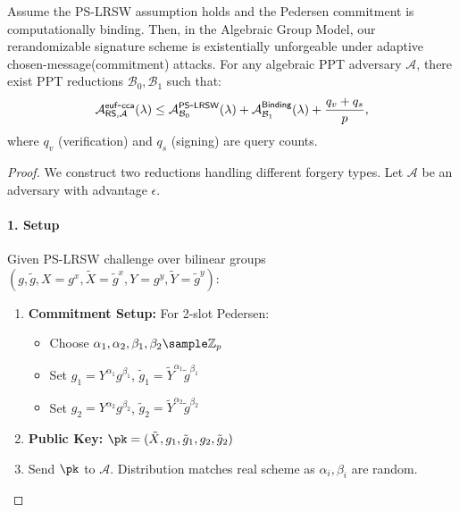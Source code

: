 \begin{theorem}
Assume the PS-LRSW assumption holds and the Pedersen commitment is computationally binding. Then, in the Algebraic Group Model, our rerandomizable signature scheme is existentially unforgeable under adaptive chosen-message(commitment) attacks. For any algebraic PPT adversary $\mathcal{A}$, there exist PPT reductions $\mathcal{B}_0, \mathcal{B}_1$ such that:
\[
\mathcal{A}^{\mathsf{euf\mbox{-}cca}}_{\mathsf{RS},\mathcal{A}}(\lambda) \leq \mathcal{A}^{\mathsf{PS\mbox{-}LRSW}}_{\mathcal{B}_0}(\lambda) + \mathcal{A}^{\mathsf{Binding}}_{\mathcal{B}_1}(\lambda) + \frac{q_v + q_s}{p},
\]
where $q_v$ (verification) and $q_s$ (signing) are query counts.
\end{theorem}

\begin{proof}
We construct two reductions handling different forgery types. Let $\mathcal{A}$ be an adversary with advantage $\epsilon$.

\paragraph{1. Setup}
Given PS-LRSW challenge over bilinear groups $(g, \tilde{g}, X=g^x, \tilde{X}=\tilde{g}^x, Y=g^y, \tilde{Y}=\tilde{g}^y)$:
\begin{enumerate}
    \item \textbf{Commitment Setup:} For 2-slot Pedersen:
    \begin{itemize}
        \item Choose $\alpha_1, \alpha_2, \beta_1, \beta_2 \sample \Z_p$
        \item Set $g_1 = Y^{\alpha_1}g^{\beta_1}$, $\tilde{g}_1 = \tilde{Y}^{\alpha_1}\tilde{g}^{\beta_1}$ 
        \item Set $g_2 = Y^{\alpha_2}g^{\beta_2}$, $\tilde{g}_2 = \tilde{Y}^{\alpha_2}\tilde{g}^{\beta_2}$
    \end{itemize}
    \item \textbf{Public Key:} $\pk = (\tilde{X}, g_1, \tilde{g}_1, g_2, \tilde{g}_2)$
    \item Send $\pk$ to $\mathcal{A}$. Distribution matches real scheme as $\alpha_i, \beta_i$ are random.
\end{enumerate}



\end{proof}
